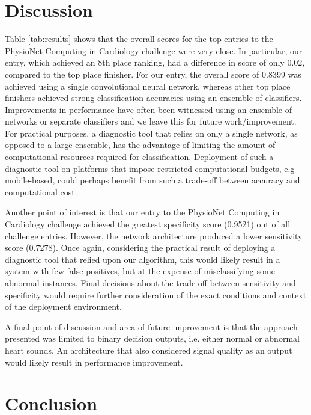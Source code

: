 \documentclass{article}
\begin{document}
\section{Discussion}
\label{sec:discussion}

Table \ref{tab:results} shows that the overall scores for the top entries to the PhysioNet Computing in Cardiology challenge were very close. In particular, our entry, which achieved an 8th place ranking, had a difference in score of only 0.02, compared to the top place finisher. For our entry, the overall score of 0.8399 was achieved using a single convolutional neural network, whereas other top place finishers achieved strong classification accuracies using an ensemble of classifiers. Improvements in performance have often been witnessed using an ensemble of networks or separate classifiers and we leave this for future work/improvement. For practical purposes, a diagnostic tool that relies on only a single network, as opposed to a large ensemble, has the advantage of limiting the amount of computational resources required for classification. Deployment of such a diagnostic tool on platforms that impose restricted computational budgets, e.g mobile-based, could perhaps benefit from such a trade-off between accuracy and computational cost.

Another point of interest is that our entry to the PhysioNet Computing in Cardiology challenge achieved the greatest specificity score (0.9521) out of all challenge entries. However, the network architecture produced a lower sensitivity score (0.7278). Once again, considering the practical result of deploying a diagnostic tool that relied upon our algorithm, this would likely result in a system with few false positives, but at the expense of misclassifying some abnormal instances. Final decisions about the trade-off between sensitivity and specificity would require further consideration of the exact conditions and context of the deployment environment.

A final point of discussion and area of future improvement is that the approach presented was limited to binary decision outputs, i.e. either normal or abnormal heart sounds. An architecture that also considered signal quality as an output would likely result in performance improvement. 

\section{Conclusion}
\label{sec:conclusion}
\end{document}
